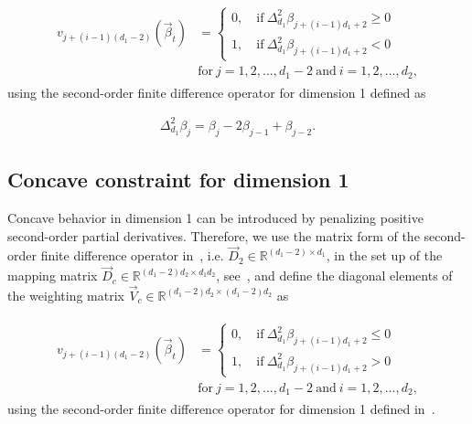 \begin{align}
	\begin{split}
	v_{j+(i-1)(d_1-2)}(\vec{\beta}_t) {}&= \begin{cases}
		0, \quad \text{if} \ \Delta^2_{d_1} \beta_{j+(i-1)d_1+2} \ge 0 \\ 
		1, \quad \text{if} \ \Delta^2_{d_1} \beta_{j+(i-1)d_1+2} < 0
	\end{cases}	\\ {}& \text{for} \ j=1,2,\dots,d_1-2 \ \text{and} \ i=1,2,\dots,d_2,
	\end{split}
\end{align}
%
using the second-order finite difference operator for dimension 1 defined as

\begin{align} \label{eq:FD-operator2-dim1}
	\Delta^2_{d_1} \beta_j = \beta_j - 2\beta_{j-1} + \beta_{j-2}.
\end{align}


\subsection{Concave constraint for dimension 1} \label{subsec:CONC-TP-one-dim}

Concave behavior in dimension 1 can be introduced by penalizing positive second-order partial derivatives. Therefore, we  use the matrix form of the second-order finite difference operator in~, i.e. $\vec{D}_2 \in \mathbb{R}^{(d_1-2) \times d_1}$, in the set up of the mapping matrix $\vec{D}_c \in \mathbb{R}^{(d_1-2)d_2 \times d_1d_2}$, see~, and define the diagonal elements of the weighting matrix $\vec{V}_c \in \mathbb{R}^{(d_1-2)d_2 \times (d_1-2)d_2}$ as

\begin{align}
	\begin{split}
	v_{j+(i-1)(d_1-2)}(\vec{\beta}_t) {}&= \begin{cases}
		0, \quad \text{if} \ \Delta^2_{d_1} \beta_{j+(i-1)d_1+2} \le 0 \\ 
		1, \quad \text{if} \ \Delta^2_{d_1} \beta_{j+(i-1)d_1+2} > 0
	\end{cases}	\\ {}& \text{for} \ j=1,2,\dots,d_1-2 \ \text{and} \ i=1,2,\dots,d_2,
	\end{split}
\end{align}
%
using the second-order finite difference operator for dimension 1 defined in~.

